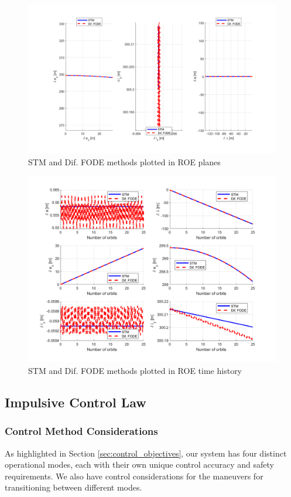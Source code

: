 \begin{figure}[H]
    \centering
    \includegraphics[width=0.75\linewidth]{sim/figures/PS5/mode_1_ROE_Planes.png}
    \caption{STM and Dif. FODE methods plotted in ROE planes}
    \label{fig:roe_plane_compare_method}
\end{figure}
\begin{figure}[H]
    \centering
    \includegraphics[width=0.75\linewidth]{sim/figures/PS5/mode_1_ROE_Time.png}
    \caption{STM and Dif. FODE methods plotted in ROE time history}
    \label{fig:roe_time_compare_method}
\end{figure}
\subsection{Impulsive Control Law}

\subsubsection{Control Method Considerations}\label{sec:control_considerations}

As highlighted in Section \ref{sec:control_objectives}, our system has four distinct operational modes, each with their own unique control accuracy and safety requirements. We also have control considerations for the maneuvers for transitioning between different modes.

